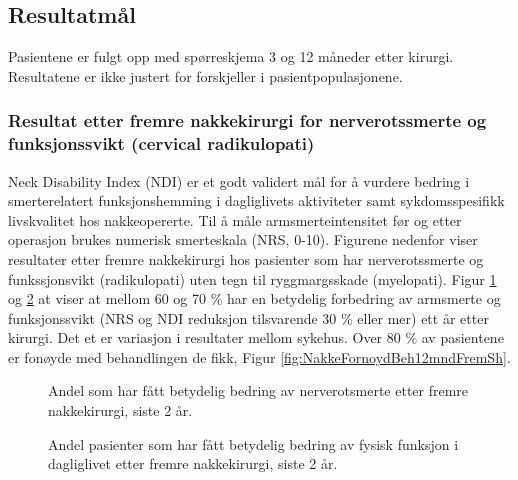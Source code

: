 \clearpage

\subsection{Resultatmål}

Pasientene er fulgt opp med spørreskjema 3 og 12 måneder etter kirurgi.
Resultatene er ikke justert for forskjeller i pasientpopulasjonene.


\subsubsection{Resultat etter fremre nakkekirurgi for nerverotssmerte og funksjonssvikt (cervical radikulopati)}




Neck Disability Index (NDI) er et godt validert mål for å vurdere bedring i smerterelatert
funksjonshemming  i dagliglivets aktiviteter samt sykdomsspesifikk livskvalitet hos 
nakkeopererte. Til å måle armsmerteintensitet før og etter operasjon brukes numerisk 
smerteskala (NRS, 0-10). Figurene nedenfor viser resultater etter fremre nakkekirurgi hos 
pasienter som har nerverotssmerte og funkssjonsvikt (radikulopati) uten tegn til 
ryggmargsskade 
(myelopati). Figur \ref{fig:NakkeNRSsmerteArmEndr12mndUmFSh} og  
\ref{fig:NakkeNDIendr12mndUmFSh} at viser at mellom 60 og 70 \% har en betydelig forbedring av 
armsmerte og funksjonssvikt (NRS og NDI reduksjon tilsvarende 30 \%  eller mer) ett år etter 
kirurgi. Det et er variasjon i resultater mellom sykehus. Over 80 \% av pasientene er fonøyde 
med behandlingen de fikk, Figur \ref{fig:NakkeFornoydBeh12mndFremSh}.  





\begin{figure}[ht]
\caption{\label{fig:NakkeNRSsmerteArmEndr12mndUmFSh} Andel som har fått betydelig bedring av nerverotsmerte  etter fremre nakkekirurgi, siste 2 år.}
\end{figure}

\begin{figure}[ht]
\caption{\label{fig:NakkeNDIendr12mndUmFSh} Andel pasienter som har fått betydelig bedring av fysisk funksjon i dagliglivet etter fremre nakkekirurgi, siste 2 år.}
\end{figure}

